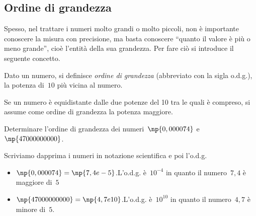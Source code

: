 \subsection{Ordine di grandezza}

Spesso, nel trattare i numeri molto grandi o molto piccoli, non è importante conoscere
la misura con precisione, ma basta conoscere ``quanto il valore è più o meno grande'',
cioè l'entità della sua grandezza. Per fare ciò si introduce il seguente concetto.

\begin{definizione}
Dato un numero, si definisce \emph{ordine di grandezza} (abbreviato con la sigla o.d.g.),
la potenza di~$10$ più vicina al numero.
\end{definizione}

Se un numero è equidistante dalle due potenze del 10 tra le quali è compreso, si assume come ordine di grandezza la potenza maggiore.

\pagebreak
\begin{exrig}
 \begin{esempio}
Determinare l'ordine di grandezza dei numeri~$\np{0,000074}$ e~$\np{47000000000}$.

Scriviamo dapprima i numeri in notazione scientifica e poi l'o.d.g.
\begin{itemize}
  \item $\np{0,000074}=\np{7,4e-5}$.\quad L'o.d.g. è~$10^{-4}$ in quanto il numero~$7,4$ è maggiore di~$5$
  \item $\np{47000000000}=\np{4,7e10}$.\quad L'o.d.g. è~$10^{10}$ in quanto il numero~$4,7$ è minore di~$5$.
\end{itemize}
 \end{esempio}
\end{exrig}


